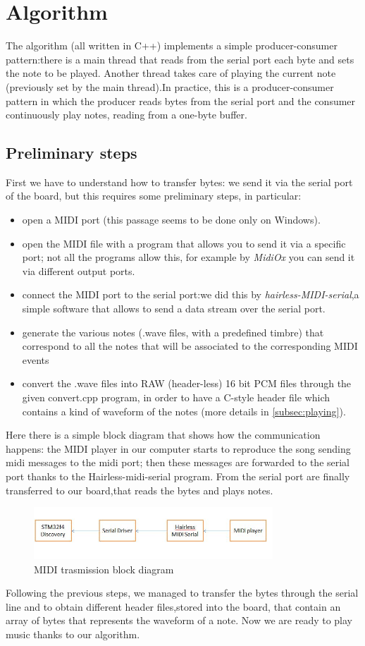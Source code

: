\documentclass[12pt]{article}
\begin{document}
\section{Algorithm} \label{sec:algorithm}
The algorithm (all written in C++) implements a simple producer-consumer pattern:there is a main thread that reads from the serial port each byte and sets the note to be played. Another thread takes care of playing the current note (previously set by the main thread).In practice, this is a producer-consumer pattern in which the producer reads bytes from the serial port and the consumer continuously play notes, reading from a one-byte buffer.

\subsection{Preliminary steps}\label{subsec:pre_steps}
First we have to understand how to transfer bytes: we send it via the serial port of the board, but this requires some preliminary steps, in particular:
\begin{itemize}
	\item open a MIDI port (this passage seems to be done only on Windows).
	\item open the MIDI file with a program that allows you to send it via a specific port; not all the programs allow this, for example by \textit{MidiOx}  you can send it via different output ports.
	\item connect the MIDI port to the serial port:we did this by \textit{hairless-MIDI-serial},a simple software that allows to send a data stream over the serial port.
	\item generate the various notes (.wave files, with a predefined timbre) that correspond to all the notes that will be associated to the corresponding MIDI events 
	\item convert the .wave files into RAW (header-less) 16 bit PCM files through the given convert.cpp program, in order to have a C-style header file which contains a kind of waveform of the notes (more details in \ref{subsec:playing}).
\end{itemize}
Here there is a simple block diagram that shows how the communication happens: the MIDI player in our computer starts to reproduce the song sending midi messages to the midi port; then these messages are forwarded to the serial port thanks to the Hairless-midi-serial program. From the serial port are finally transferred to our board,that reads the bytes and plays notes.
 \begin{figure}[H]
 	\includegraphics[width=0.8\textwidth]{Schema.jpg}
 	\caption{MIDI trasmission block diagram}
 	\label{fig:block}
 \end{figure}
Following the previous steps, we managed to transfer the bytes through the serial line and to obtain different header files,stored into the board, that contain an array of bytes that represents the waveform of a note. Now we are ready to play music thanks to our algorithm.
\end{document}
